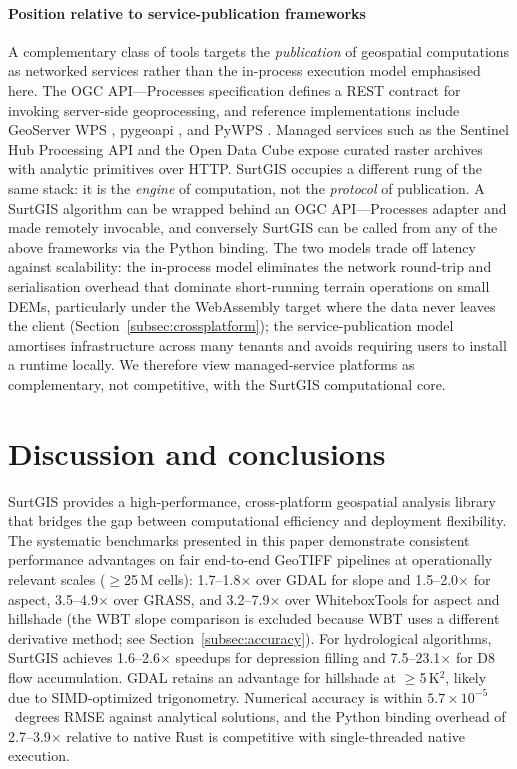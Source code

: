 \documentclass[preprint,review,12pt,authoryear]{elsarticle}
\begin{document}
\paragraph{Position relative to service-publication frameworks} A complementary class of tools targets the \emph{publication} of geospatial computations as networked services rather than the in-process execution model emphasised here. The OGC API---Processes specification \citep{ogcapi_processes2024} defines a REST contract for invoking server-side geoprocessing, and reference implementations include GeoServer WPS \citep{geoserver_wps}, pygeoapi \citep{pygeoapi2023}, and PyWPS \citep{pywps2025}. Managed services such as the Sentinel Hub Processing API \citep{sentinelhub_api} and the Open Data Cube \citep{killough2018odc} expose curated raster archives with analytic primitives over HTTP. SurtGIS occupies a different rung of the same stack: it is the \emph{engine} of computation, not the \emph{protocol} of publication. A SurtGIS algorithm can be wrapped behind an OGC API---Processes adapter and made remotely invocable, and conversely SurtGIS can be called from any of the above frameworks via the Python binding. The two models trade off latency against scalability: the in-process model eliminates the network round-trip and serialisation overhead that dominate short-running terrain operations on small DEMs, particularly under the WebAssembly target where the data never leaves the client (Section~\ref{subsec:crossplatform}); the service-publication model amortises infrastructure across many tenants and avoids requiring users to install a runtime locally. We therefore view managed-service platforms as complementary, not competitive, with the SurtGIS computational core.

\section{Discussion and conclusions}
\label{sec:conclusions}

SurtGIS provides a high-performance, cross-platform geospatial analysis library that bridges the gap between computational efficiency and deployment flexibility. The systematic benchmarks presented in this paper demonstrate consistent performance advantages on fair end-to-end GeoTIFF pipelines at operationally relevant scales ($\geq$25\,M cells): 1.7--1.8$\times$ over GDAL for slope and 1.5--2.0$\times$ for aspect, 3.5--4.9$\times$ over GRASS, and 3.2--7.9$\times$ over WhiteboxTools for aspect and hillshade (the WBT slope comparison is excluded because WBT uses a different derivative method; see Section~\ref{subsec:accuracy}). For hydrological algorithms, SurtGIS achieves 1.6--2.6$\times$ speedups for depression filling and 7.5--23.1$\times$ for D8 flow accumulation. GDAL retains an advantage for hillshade at $\geq$5\,K$^2$, likely due to SIMD-optimized trigonometry. Numerical accuracy is within $5.7 \times 10^{-5}$~degrees RMSE against analytical solutions, and the Python binding overhead of 2.7--3.9$\times$ relative to native Rust is competitive with single-threaded native execution.
\end{document}

